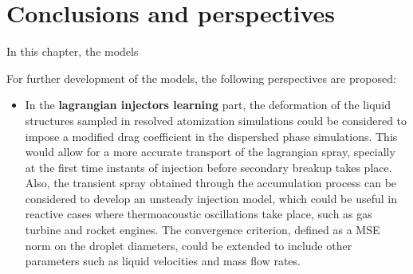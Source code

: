 %
%
%
%
%	
%
%
%
%
%
%


\section{Conclusions and perspectives}

In this chapter, the models 


For further development of the models, the following perspectives are proposed:

\begin{itemize}

	\item In the \textbf{lagrangian injectors learning} part, the deformation of the liquid structures sampled in resolved atomization simulations could be considered to impose a modified drag coefficient in the dispershed phase simulations. This would allow for a more accurate transport of the lagrangian spray, specially at the first time instants of injection before secondary breakup takes place. Also, the transient spray obtained through the accumulation process can be considered to develop an unsteady injection model, which could be useful in reactive cases where thermoacoustic oscillations take place, such as gas turbine and rocket engines. The convergence criterion, defined as a MSE norm on the droplet diameters, could be extended to include other parameters such as liquid velocities and mass flow rates.

\end{itemize}
